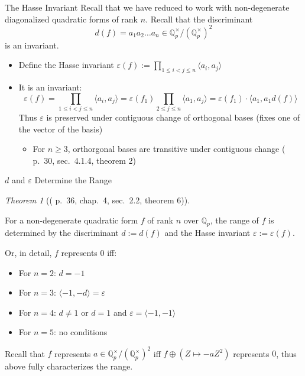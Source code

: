 \documentclass[fontset=fandol,envcountsect]{ctexbeamer}
\providecommand{\tightlist}{%
  \setlength{\itemsep}{0pt}\setlength{\parskip}{0pt}}\usepackage{longtable,booktabs,array}
\theoremstyle{theorem}
\newtheorem{theorem}{定理}
\theoremstyle{example}
\theoremstyle{remark}
\theoremstyle{theorem}
\newtheorem{theorem}{Theorem}
\theoremstyle{example}
\theoremstyle{remark}
\newcommand{\myemph}[1]{{\usebeamercolor[fg]{structure} #1}}
\renewcommand{\emph}{\myemph}
\begin{document}
\begin{frame}{The Hasse Invariant}
\label{the-hasse-invariant}
Recall that we have reduced to work with non-degenerate diagonalized
quadratic forms of rank \(n\). Recall that the discriminant \[
d(f) = a_1 a_2 \dots a_n \in \mathbb Q_p^\times / (\mathbb Q_p^\times)^2
\] is an invariant.

\begin{itemize}
\item
  Define the \emph{Hasse invariant}
  \(\varepsilon(f) := \prod_{1 \leq i < j \leq n} \langle a_i, a_j \rangle\)
\item
  It is an invariant: \[
  \varepsilon(f) = \prod_{1 \leq i < j \leq n} \langle a_i, a_j \rangle = \varepsilon(f_1) \prod_{2 \leq j \leq n} \langle a_1, a_j \rangle = \varepsilon(f_1) \cdot \langle a_1, a_1 d(f) \rangle
  \] Thus \(\varepsilon\) is preserved under \emph{contiguous} change of
  orthogonal bases (fixes one of the vector of the basis)

  \begin{itemize}
  \tightlist
  \item
    For \(n \geq 3\), orthorgonal bases are transitive under contiguous
    change (\autocite{serre_course_1973} p.~30, sec.~4.1.4, theorem 2)
  \end{itemize}
\end{itemize}
\end{frame}

\begin{frame}{\(d\) and \(\varepsilon\) Determine the Range}
\label{d-and-varepsilon-determine-the-range}
\begin{theorem}[(\autocite{serre_course_1973} p.~36, chap.~4, sec.~2.2,
theorem
6)]\protect\hypertarget{thm-qp-range-determine}{}\label{thm-qp-range-determine}

For a non-degenerate quadratic form \(f\) of rank \(n\) over
\(\mathbb Q_p\), the range of \(f\) is determined by the discriminant
\(d := d(f)\) and the Hasse invariant \(\varepsilon := \varepsilon(f)\).

Or, in detail, \(f\) represents \(0\) iff:

\begin{itemize}
\tightlist
\item
  For \(n=2\): \(d=-1\)
\item
  For \(n=3\): \(\langle -1,-d \rangle = \varepsilon\)
\item
  For \(n=4\): \(d \neq 1\) or \(d=1\) and
  \(\varepsilon = \langle -1,-1 \rangle\)
\item
  For \(n=5\): no conditions
\end{itemize}

\end{theorem}

Recall that \(f\) represents
\(a \in \mathbb Q_p^\times / (\mathbb Q_p^\times)^2\) iff
\(f \oplus (Z \mapsto -a Z^2)\) represents \(0\), thus above fully
characterizes the range.
\end{frame}
\end{document}
